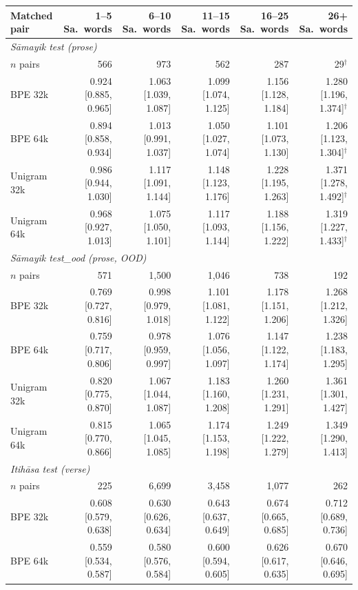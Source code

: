 \begin{table}[t]
\centering
\setlength{\tabcolsep}{3.5pt}
\scriptsize
\begin{tabular}{lrrrrr}
\toprule
Matched pair & 1--5 Sa.\ words & 6--10 Sa.\ words & 11--15 Sa.\ words & 16--25 Sa.\ words & 26+ Sa.\ words \\
\midrule
\multicolumn{6}{l}{\emph{S\=amayik test (prose)}} \\
$n$ pairs & 566 & 973 & 562 & 287 & 29$^{\dagger}$ \\
BPE 32k & 0.924 [0.885, 0.965] & 1.063 [1.039, 1.087] & 1.099 [1.074, 1.125] & 1.156 [1.128, 1.184] & 1.280 [1.196, 1.374]$^{\dagger}$ \\
BPE 64k & 0.894 [0.858, 0.934] & 1.013 [0.991, 1.037] & 1.050 [1.027, 1.074] & 1.101 [1.073, 1.130] & 1.206 [1.123, 1.304]$^{\dagger}$ \\
Unigram 32k & 0.986 [0.944, 1.030] & 1.117 [1.091, 1.144] & 1.148 [1.123, 1.176] & 1.228 [1.195, 1.263] & 1.371 [1.278, 1.492]$^{\dagger}$ \\
Unigram 64k & 0.968 [0.927, 1.013] & 1.075 [1.050, 1.101] & 1.117 [1.093, 1.144] & 1.188 [1.156, 1.222] & 1.319 [1.227, 1.433]$^{\dagger}$ \\
\midrule
\multicolumn{6}{l}{\emph{S\=amayik test\_ood (prose, OOD)}} \\
$n$ pairs & 571 & 1,500 & 1,046 & 738 & 192 \\
BPE 32k & 0.769 [0.727, 0.816] & 0.998 [0.979, 1.018] & 1.101 [1.081, 1.122] & 1.178 [1.151, 1.206] & 1.268 [1.212, 1.326] \\
BPE 64k & 0.759 [0.717, 0.806] & 0.978 [0.959, 0.997] & 1.076 [1.056, 1.097] & 1.147 [1.122, 1.174] & 1.238 [1.183, 1.295] \\
Unigram 32k & 0.820 [0.775, 0.870] & 1.067 [1.044, 1.087] & 1.183 [1.160, 1.208] & 1.260 [1.231, 1.291] & 1.361 [1.301, 1.427] \\
Unigram 64k & 0.815 [0.770, 0.866] & 1.065 [1.045, 1.085] & 1.174 [1.153, 1.198] & 1.249 [1.222, 1.279] & 1.349 [1.290, 1.413] \\
\midrule
\multicolumn{6}{l}{\emph{Itih\=asa test (verse)}} \\
$n$ pairs & 225 & 6,699 & 3,458 & 1,077 & 262 \\
BPE 32k & 0.608 [0.579, 0.638] & 0.630 [0.626, 0.634] & 0.643 [0.637, 0.649] & 0.674 [0.665, 0.685] & 0.712 [0.689, 0.736] \\
BPE 64k & 0.559 [0.534, 0.587] & 0.580 [0.576, 0.584] & 0.600 [0.594, 0.605] & 0.626 [0.617, 0.635] & 0.670 [0.646, 0.695] \\

\end{tabular}
\end{table}
